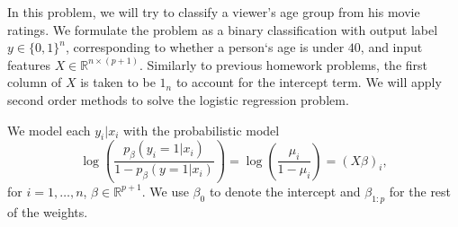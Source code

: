 \documentclass{article}
\theoremstyle{remark}
\theoremstyle{definition}
\begin{document}
In this problem, we will try to classify a viewer's age group from his movie ratings. We formulate the problem as a binary classification with output label  $y \in \{0,1\}^n$, corresponding to whether a person`s age is under $40$, and input features $X \in \mathbb{R}^{n \times (p+1)}$. Similarly to previous homework problems, the first column of $X$ is taken to be $1_n$ to account for the intercept term. We will apply second order methods to solve the logistic regression problem.

We model each $y_i|x_i$ with the probabilistic model
  \[
    \log\left(\frac{p_{\beta}(y_i = 1|x_i)}{1-p_{\beta}(y =
        1|x_i)}\right) = \log\left(\frac{\mu_i}{1-\mu_i}\right) = (X\beta)_i,
  \]
  for $i=1,\ldots,n$, $\beta \in \mathbb{R}^{p+1}$. We use $\beta_0$ to denote the intercept and $\beta_{1:p}$ for the rest of the weights. 
\end{document}
